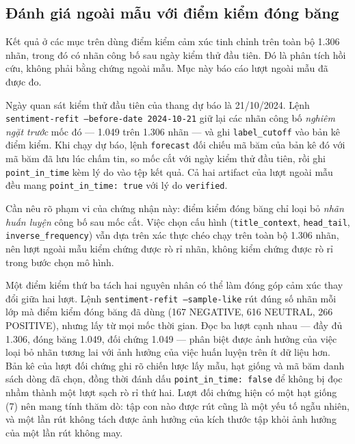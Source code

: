 \subsection{Đánh giá ngoài mẫu với điểm kiểm đóng băng}
\label{sec:kq-point-in-time}

Kết quả ở các mục trên dùng điểm kiểm cảm xúc tinh chỉnh trên toàn bộ 1.306 nhãn,
trong đó có nhãn công bố sau ngày kiểm thử đầu tiên. Đó là phân tích hồi cứu, không
phải bằng chứng ngoài mẫu. Mục này báo cáo lượt ngoài mẫu đã được đo.

Ngày quan sát kiểm thử đầu tiên của thang dự báo là 21/10/2024. Lệnh
\texttt{sentiment-refit --before-date 2024-10-21} giữ lại các nhãn công bố
\emph{nghiêm ngặt trước} mốc đó --- 1.049 trên 1.306 nhãn --- và ghi
\texttt{label\_cutoff} vào bản kê điểm kiểm. Khi chạy dự báo, lệnh \texttt{forecast}
đối chiếu mã băm của bản kê đó với mã băm đã lưu lúc chấm tin, so mốc cắt với ngày
kiểm thử đầu tiên, rồi ghi \texttt{point\_in\_time} kèm lý do vào tệp kết quả. Cả
hai artifact của lượt ngoài mẫu đều mang \texttt{point\_in\_time: true} với lý do
\texttt{verified}.

Cần nêu rõ phạm vi của chứng nhận này: điểm kiểm đóng băng chỉ loại bỏ
\emph{nhãn huấn luyện} công bố sau mốc cắt. Việc chọn cấu hình
(\texttt{title\_context}, \texttt{head\_tail}, \texttt{inverse\_frequency}) vẫn
dựa trên xác thực chéo chạy trên toàn bộ 1.306 nhãn, nên lượt ngoài mẫu kiểm
chứng được rò rỉ nhãn, không kiểm chứng được rò rỉ trong bước chọn mô hình.

Một điểm kiểm thứ ba tách hai nguyên nhân có thể làm đóng góp cảm xúc thay đổi giữa
hai lượt. Lệnh \texttt{sentiment-refit --sample-like} rút đúng số nhãn mỗi lớp mà
điểm kiểm đóng băng đã dùng (167 NEGATIVE, 616 NEUTRAL, 266 POSITIVE), nhưng lấy từ
mọi mốc thời gian. Đọc ba lượt cạnh nhau --- đầy đủ 1.306, đóng băng 1.049, đối
chứng 1.049 --- phân biệt được ảnh hưởng của việc loại bỏ nhãn tương lai với ảnh
hưởng của việc huấn luyện trên ít dữ liệu hơn. Bản kê của lượt đối chứng ghi rõ
chiến lược lấy mẫu, hạt giống và mã băm danh sách dòng đã chọn, đồng thời đánh dấu
\texttt{point\_in\_time: false} để không bị đọc nhầm thành một lượt sạch rò rỉ thứ
hai. Lượt đối chứng hiện có một hạt giống (7) nên mang tính thăm dò: tập con nào
được rút cũng là một yếu tố ngẫu nhiên, và một lần rút không tách được ảnh hưởng
của kích thước tập khỏi ảnh hưởng của một lần rút không may.


